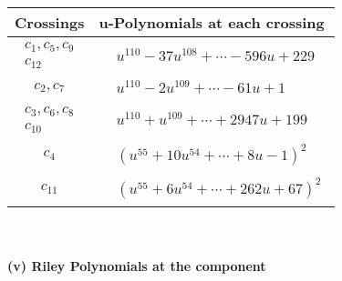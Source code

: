 \documentclass[1p]{elsarticle_modified}
\theoremstyle{definition}
\begin{document}
\begin{tabular}{m{50pt}|m{274pt}}
Crossings & \hspace{64pt}u-Polynomials at each crossing \\
\hline $$\begin{aligned}c_{1},c_{5},c_{9}\\c_{12}\end{aligned}$$&$\begin{aligned}
&u^{110}-37 u^{108}+\cdots-596 u+229
\end{aligned}$\\
\hline $$\begin{aligned}c_{2},c_{7}\end{aligned}$$&$\begin{aligned}
&u^{110}-2 u^{109}+\cdots-61 u+1
\end{aligned}$\\
\hline $$\begin{aligned}c_{3},c_{6},c_{8}\\c_{10}\end{aligned}$$&$\begin{aligned}
&u^{110}+u^{109}+\cdots+2947 u+199
\end{aligned}$\\
\hline $$\begin{aligned}c_{4}\end{aligned}$$&$\begin{aligned}
&(u^{55}+10 u^{54}+\cdots+8 u-1)^{2}
\end{aligned}$\\
\hline $$\begin{aligned}c_{11}\end{aligned}$$&$\begin{aligned}
&(u^{55}+6 u^{54}+\cdots+262 u+67)^{2}
\end{aligned}$\\
\hline
\end{tabular}\\~\\
\newpage\renewcommand{\arraystretch}{1}
\flushleft \textbf{(v) Riley Polynomials at the component}\newline \\
\end{document}
